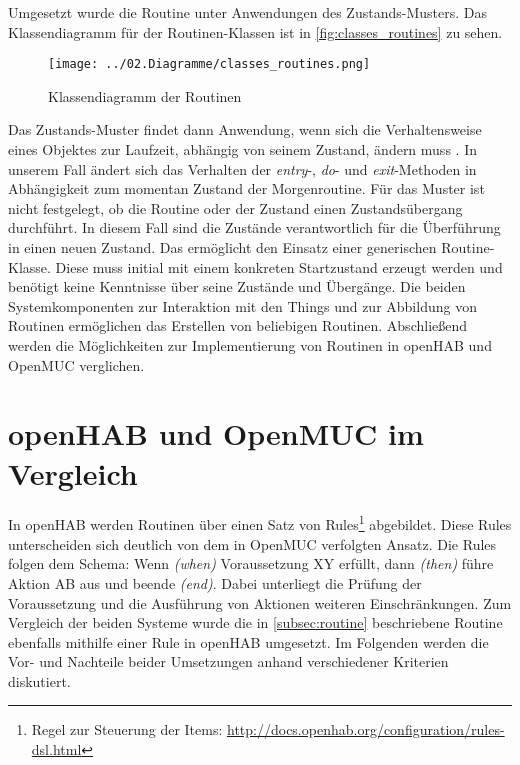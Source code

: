 Umgesetzt wurde die Routine unter Anwendungen des Zustands-Musters.
Das Klassendiagramm für der Routinen-Klassen ist in \autoref{fig:classes_routines} zu sehen.

\begin{figure}[H]
 \centering
 \texttt{[image: ../02.Diagramme/classes\_routines.png]}
 \caption{Klassendiagramm der Routinen}
 \label{fig:classes_routines}
\end{figure}

Das Zustands-Muster findet dann Anwendung, wenn sich die Verhaltensweise eines Objektes zur Laufzeit, abhängig von seinem Zustand, ändern muss \cite{gof}.
In unserem Fall ändert sich das Verhalten der \textit{entry}-, \textit{do}- und \textit{exit}-Methoden in Abhängigkeit zum momentan Zustand der Morgenroutine.
Für das Muster ist nicht festgelegt, ob die Routine oder der Zustand einen Zustandsübergang durchführt. 
In diesem Fall sind die Zustände verantwortlich für die Überführung in einen neuen Zustand.
Das ermöglicht den Einsatz einer generischen Routine-Klasse.
Diese muss initial mit einem konkreten Startzustand erzeugt werden und benötigt keine Kenntnisse über seine Zustände und Übergänge.
Die beiden Systemkomponenten zur Interaktion mit den Things und zur Abbildung von Routinen ermöglichen das Erstellen von beliebigen Routinen.
Abschließend werden die Möglichkeiten zur Implementierung von Routinen in openHAB und OpenMUC verglichen.

\section{openHAB und OpenMUC im Vergleich}

In openHAB werden Routinen über einen Satz von Rules\footnote{Regel zur Steuerung der Items: \url{http://docs.openhab.org/configuration/rules-dsl.html}}
abgebildet. Diese Rules unterscheiden sich deutlich von dem in OpenMUC verfolgten Ansatz.
Die Rules folgen dem Schema: Wenn \textit{(when)} Voraussetzung XY erfüllt, dann \textit{(then)} führe Aktion AB aus und beende \textit{(end)}.
Dabei unterliegt die Prüfung der Voraussetzung und die Ausführung von Aktionen weiteren Einschränkungen.
Zum Vergleich der beiden Systeme wurde die in \autoref{subsec:routine} beschriebene Routine ebenfalls mithilfe einer Rule in openHAB umgesetzt.
Im Folgenden werden die Vor- und Nachteile beider Umsetzungen anhand verschiedener Kriterien diskutiert.\\

